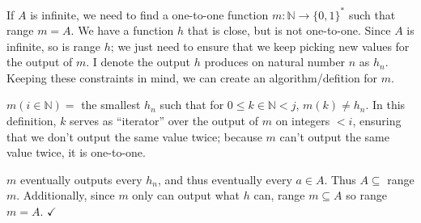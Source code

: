 \documentclass[11pt]{article}
\let\imp\rightarrow
\begin{document}
If $A$ is infinite, we need to find a one-to-one function $m: \mathbb{N} \imp \{0,1\}^*$ such that range $m = A$.
We have a function $h$ that is close, but is not one-to-one.
Since $A$ is infinite, so is range $h$; we just need to ensure that we keep picking new values for the output of $m$.
I denote the output $h$ produces on natural number $n$ as $h_n$.
Keeping these constraints in mind, we can create an algorithm/defition for $m$. 

$m(i \in \mathbb{N}) = $ the smallest $h_n$ such that for $0 \leq k \in \mathbb{N} < j$, $m( k ) \neq h_n$.
In this definition, $k$ serves as ``iterator'' over the output of $m$ on integers $< i$, ensuring that we don't output the same value twice; because $m$ can't output the same value twice, it is one-to-one.

$m$ eventually outputs every $h_n$, and thus eventually every $a \in A$. 
Thus $A \subseteq $ range $m$.
Additionally, since $m$ only can output what $h$ can, range $m \subseteq A$ so range $m = A$. $\checkmark$
\end{document}
